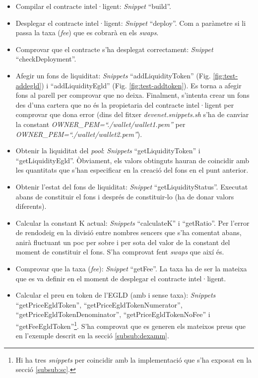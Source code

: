 \documentclass[11pt,a4paper]{article}
\begin{document}
\begin{itemize}
\item Compilar el contracte intel·ligent: \textit{Snippet} ``build''.
\item Desplegar el contracte intel·ligent: \textit{Snippet} ``deploy''. Com a paràmetre si li passa la taxa (\textit{fee}) que es cobrarà en els \textit{swaps}.
\item Comprovar que el contracte s'ha desplegat correctament: \textit{Snippet} ``checkDeployment''.
\item Afegir un fons de liquiditat: \textit{Snippets} ``addLiquidityToken'' (Fig. \ref{fig:test-addegld}) i ``addLiquidityEgld'' (Fig. \ref{fig:test-addtoken}). Es torna a afegir fons al parell per comprovar que no deixa. Finalment, s'intenta crear un fons des d'una cartera que no és la propietaria del contracte intel·ligent per comprovar que dona error (dins del fitxer \textit{devenet.snippets.sh} s'ha de canviar la constant \textit{OWNER\_PEM=``./wallet/wallet1.pem''} per \textit{OWNER\_PEM=``./wallet/wallet2.pem''}).
\item Obtenir la liquiditat del \textit{pool}: \textit{Snippets} ``getLiquidityToken'' i ``getLiquidityEgld''. Òbviament, els valors obtinguts hauran de coincidir amb les quantitats que s'han especificar en la creació del fons en el punt anterior.
\item Obtenir l'estat del fons de liquiditat: \textit{Snippet} ``getLiquidityStatus''. Executat abans de constituir el fons i després de constituir-lo (ha de donar valors diferents).
\item Calcular la constant K actual: \textit{Snippets} ``calculateK'' i ``getRatio''. Per l'error de rendodeig en la divisió entre nombres sencers que s'ha comentat abans, anirà fluctuant un poc per sobre i per sota del valor de la constant del moment de constituir el fons. S'ha comprovat fent \textit{swaps} que així és.
\item Comprovar que la taxa (\textit{fee}): \textit{Snippet} ``getFee''. La taxa ha de ser la mateixa que es va definir en el moment de desplegar el contracte intel·ligent. 
\item Calcular el preu en token de l'EGLD (amb i sense taxa): \textit{Snippets} ``getPriceEgldToken'', ``getPriceEgldTokenNumerator'', ``getPriceEgldTokenDenominator'', ``getPriceEgldTokenNoFee'' i ``getFeeEgldToken''\footnote{Hi ha tres \textit{snippets} per coincidir amb la implementació que s'ha exposat en la secció \ref{subsub:sc}.}. S'ha comprovat que es generen els mateixos preus que en l'exemple descrit en la secció \ref{subsub:dexamm}.

\end{itemize}
\end{document}

